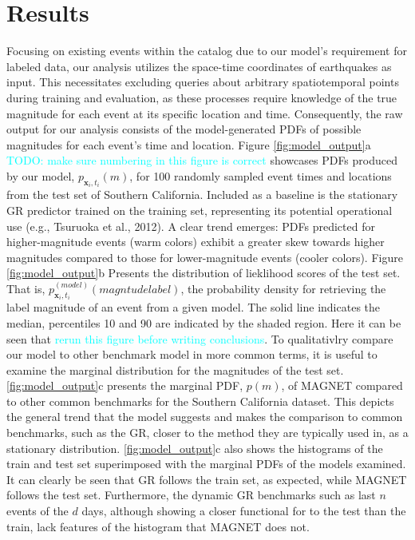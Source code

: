 \documentclass[pdflatex]{sn-jnl}
\newcommand{\neri}[1]{{\textcolor{cyan}{#1}}}
\begin{document}
\section{Results} \label{sec:results}

Focusing on existing events within the catalog due to our model's requirement for labeled data, our analysis utilizes the space-time coordinates of earthquakes as input. This necessitates excluding queries about arbitrary spatiotemporal points during training and evaluation, as these processes require knowledge of the true magnitude for each event at its specific location and time. Consequently, the raw output for our analysis consists of the model-generated PDFs of possible magnitudes for each event's time and location. Figure \ref{fig:model_output}a \neri{TODO: make sure numbering in this figure is correct} showcases PDFs produced by our model, $p_{\textbf{x}_i, t_i}(m)$, for 100 randomly sampled event times and locations from the test set of Southern California. Included as a baseline is the stationary GR predictor trained on the training set, representing its potential operational use (e.g., Tsuruoka et al., 2012). A clear trend emerges: PDFs predicted for higher-magnitude events (warm colors) exhibit a greater skew towards higher magnitudes compared to those for lower-magnitude events (cooler colors). Figure \ref{fig:model_output}b Presents the distribution of lieklihood scores of the test set. That is, $p_{\textbf{x}_i, t_i}^{(model)}(magntude label)$, the probability density for retrieving the label magnitude of an event from a given model. The solid line indicates the median, percentiles 10 and 90 are indicated by the shaded region. Here it can be seen that \neri{rerun this figure before writing conclusions}. To qualitativlry compare our model to other benchmark model in more common terms, it is useful to examine the marginal distribution for the magnitudes of the test set. \ref{fig:model_output}c presents the marginal PDF, $p(m)$, of MAGNET compared to other common benchmarks for the Southern California dataset. This depicts the general trend that the model suggests and makes the comparison to common benchmarks, such as the GR, closer to the method they are typically used in, as a stationary distribution. \ref{fig:model_output}c also shows the histograms of the train and test set superimposed with the marginal PDFs of the models examined. It can clearly be seen that GR follows the train set, as expected, while MAGNET follows the test set. Furthermore, the dynamic GR benchmarks such as last $n$ events of the $d$ days, although showing a closer functional for to the test than the train, lack features of the histogram that MAGNET does not. 
\end{document}
